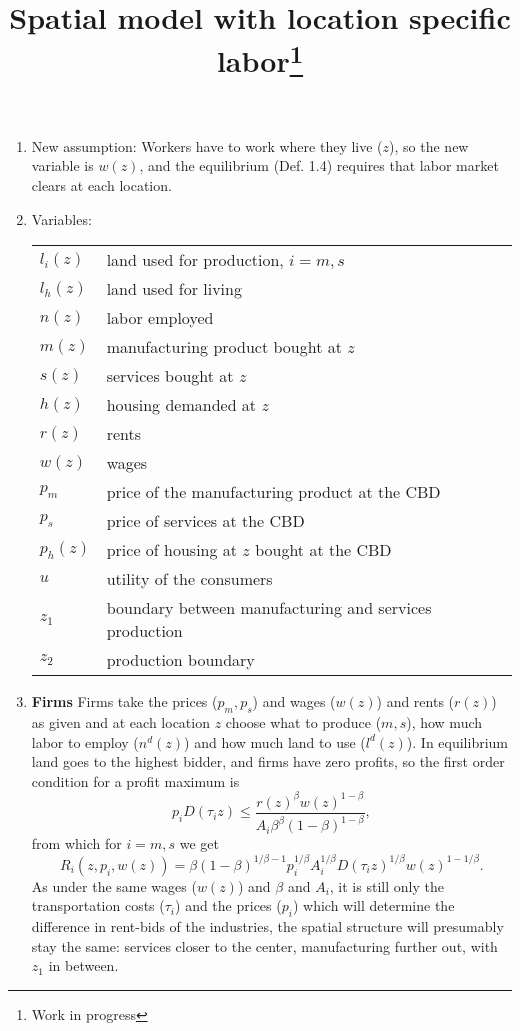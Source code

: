 \documentclass[10pt]{article}
\begin{document}
\title{Spatial model with location specific labor\thanks{Work in progress}}
\maketitle

\begin{enumerate}
\item New assumption: Workers have to work where they live ($z$), so the new variable is $w(z)$, and the equilibrium (Def. 1.4) requires that labor market clears at each location.
\item Variables:
\begin{table}[h!] 
\center
\begin{tabular}{ll}
$l_i(z)$ & land used for production, $i=m,s$ \\
$l_h(z)$ & land used for living \\
$n(z)$ & labor employed\\
$m(z)$ & manufacturing product bought at $z$ \\
$s(z)$ & services bought at $z$ \\
$h(z)$ & housing demanded at $z$ \\
$r(z)$ & rents \\
$w(z)$ & wages \\
$p_m$ & price of the manufacturing product at the CBD \\
$p_s$ & price of services at the CBD \\
$p_h(z)$ & price of housing at $z$ bought at the CBD \\
$u$ & utility of the consumers\\
$z_1$ & boundary between manufacturing and services production \\
$z_2$ & production boundary \\
\end{tabular}
\end{table}

\item \textbf{Firms}
Firms take the prices ($p_m,p_s$) and wages ($w(z)$) and rents ($r(z)$) as given and at each location $z$ choose what to produce ($m,s$), how much labor to employ ($n^d(z)$) and how much land to use ($l^d(z)$). In equilibrium land goes to the highest bidder, and firms have zero profits, so the first order condition for a profit maximum is 
\begin{equation*}
p_iD(\tau_iz)\leq \frac{r(z)^\beta w(z)^{1-\beta}}{A_i\beta^\beta(1-\beta)^{1-\beta}},
\end{equation*}
from which for $i=m,s$ we get
\begin{equation}\label{eq:bidrent:industry}
R_i(z,p_i,w(z)) = \beta (1-\beta)^{1/\beta-1} p_i^{1/\beta} A_i^{1/\beta} D(\tau_i z)^{1/\beta}w(z)^{1-1/\beta}.
\end{equation}
As under the same wages ($w(z)$) and $\beta$ and $A_i$, it is still only the transportation costs ($\tau_i$) and the prices ($p_i$) which will determine the difference in rent-bids of the industries, the spatial structure will presumably stay the same: services closer to the center, manufacturing further out, with $z_1$ in between.


\end{enumerate}
\end{document}
